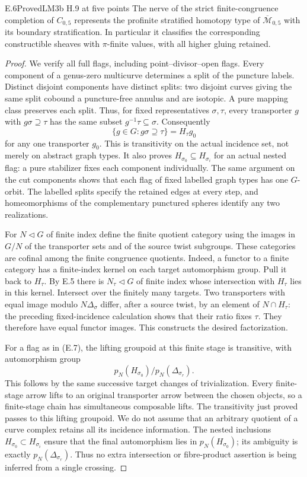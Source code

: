 \begin{result}{E.6}{Proved}{LM3b H.9 at five points}
The nerve of the strict finite-congruence completion of $C_{0,5}$
represents the profinite stratified homotopy type of
$\overline{\mathcal M}_{0,5}$ with its boundary stratification.
In particular it classifies the corresponding constructible sheaves
with $\pi$-finite values, with all higher gluing retained.
\end{result}
\begin{proof}
We verify all full flags, including point--divisor--open flags.
Every component of a genus-zero multicurve determines a split of
the puncture labels.  Distinct disjoint components have distinct
splits: two disjoint curves giving the same split cobound a
puncture-free annulus and are isotopic.  A pure mapping class
preserves each split.  Thus, for fixed representatives $\sigma,\tau$,
every transporter $g$ with $g\sigma\supseteq\tau$ has the same
subset $g^{-1}\tau\subseteq\sigma$.  Consequently
\[
 \{g\in G:g\sigma\supseteq\tau\}=H_\tau g_0
\]
for any one transporter $g_0$.  This is transitivity on the actual
incidence set, not merely on abstract graph types.  It also proves
$H_{\sigma_0}\subseteq H_{\sigma_i}$ for an actual nested flag:
a pure stabilizer fixes each component individually.  The same
argument on the cut components shows that each flag of fixed
labelled graph types has one $G$-orbit.  The labelled splits specify
the retained edges at every step, and homeomorphisms of the
complementary punctured spheres identify any two realizations.

For $N\lhd G$ of finite index define the finite quotient category
using the images in $G/N$ of the transporter sets and of the source
twist subgroups.  These categories are cofinal among the finite
congruence quotients.  Indeed, a functor to a finite category has a
finite-index kernel on each target automorphism group.  Pull it back
to $H_\tau$.  By E.5 there is $N_\tau\lhd G$ of finite index whose
intersection with $H_\tau$ lies in this kernel.  Intersect over the
finitely many targets.  Two transporters with equal image modulo
$N\Delta_\sigma$ differ, after a source twist, by an element of
$N\cap H_\tau$: the preceding fixed-incidence calculation shows
that their ratio fixes $\tau$.  They therefore have equal functor
images.  This
constructs the desired factorization.

For a flag as in (E.7), the lifting groupoid at this finite stage is
transitive, with automorphism group
\[
 p_N(H_{\sigma_0})/p_N(\Delta_{\sigma_r}).                    \tag{E.8a}
\]
This follows by the same successive target changes of trivialization.
Every finite-stage arrow lifts to an original transporter arrow
between the chosen objects, so a finite-stage chain has simultaneous
composable lifts.  The transitivity just proved passes to this
lifting groupoid.  We do not assume that an arbitrary quotient of
a curve complex retains all its incidence information.
The nested inclusions $H_{\sigma_0}\subset H_{\sigma_i}$ ensure that
the final automorphism lies in $p_N(H_{\sigma_0})$; its ambiguity is
exactly $p_N(\Delta_{\sigma_r})$.  Thus no extra intersection or
fibre-product assertion is being inferred from a single crossing.


\end{proof}
